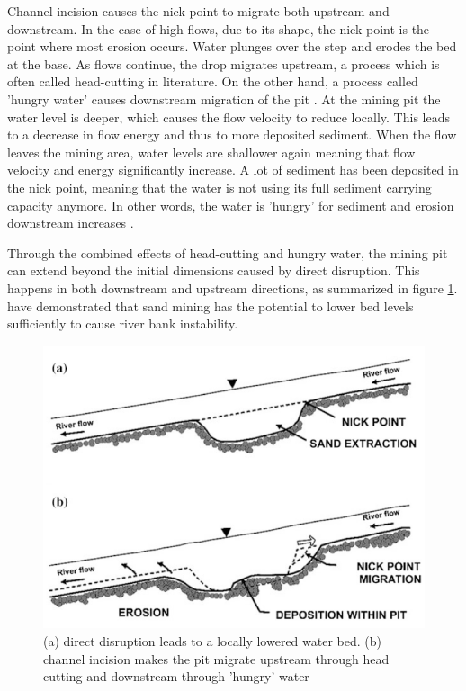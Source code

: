 Channel incision causes the nick point to migrate both upstream and downstream. In the case of high flows, due to its shape, the nick point is the point where most erosion occurs. Water plunges over the step and erodes the bed at the base. As flows continue, the drop migrates upstream, a process which is often called head-cutting in literature. On the other hand, a process called 'hungry water' causes downstream migration of the pit \autocite{sand-mining-boek}. At the mining pit the water level is deeper, which causes the flow velocity to reduce locally. This leads to a decrease in flow energy and thus to more deposited sediment. When the flow leaves the mining area, water levels are shallower again meaning that flow velocity and energy significantly increase. A lot of sediment has been deposited in the nick point, meaning that the water is not using its full sediment carrying capacity anymore. In other words, the water is 'hungry' for sediment and erosion downstream increases \autocite{sand-mining-boek}. 

Through the combined effects of head-cutting and hungry water, the mining pit can extend beyond the initial dimensions caused by direct disruption. This happens in both downstream and upstream directions, as summarized in figure \ref{fig:channelbedeffects}. \textcite{hackneyRiverBankInstability2020} have demonstrated that sand mining has the potential to lower bed levels sufficiently to
cause river bank instability.

\begin{figure}[H]
    \centering
    \includegraphics[width=0.75\linewidth]{figures/channelbedeffects.png}
    \caption{(a) direct disruption leads to a locally lowered water bed. (b) channel incision makes the pit migrate upstream through head cutting and downstream through 'hungry' water \autocite{sand-mining-boek}}
    \label{fig:channelbedeffects}
\end{figure}


